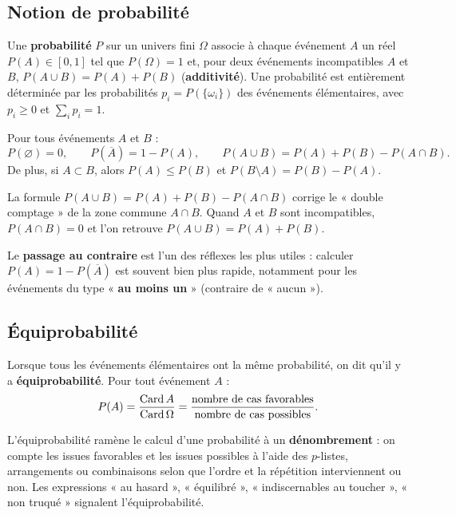 \subsection{Notion de probabilité}

\begin{definition}[Probabilité]
Une \textbf{probabilité} $P$ sur un univers fini $\Omega$ associe à chaque
événement $A$ un réel $P(A)\in[0,1]$ tel que $P(\Omega)=1$ et, pour deux
événements incompatibles $A$ et $B$, $P(A\cup B)=P(A)+P(B)$ (\textbf{additivité}).
Une probabilité est entièrement déterminée par les probabilités $p_i=P(\{\omega_i\})$
des événements élémentaires, avec $p_i\ge0$ et $\sum_i p_i=1$.
\end{definition}

\begin{propriete}
Pour tous événements $A$ et $B$ :
\[
P(\varnothing)=0,\qquad
P(\overline A)=1-P(A),\qquad
P(A\cup B)=P(A)+P(B)-P(A\cap B).
\]
De plus, si $A\subset B$, alors $P(A)\le P(B)$ et $P(B\setminus A)=P(B)-P(A)$.
\end{propriete}

\begin{remarque}
La formule $P(A\cup B)=P(A)+P(B)-P(A\cap B)$ corrige le « double comptage » de la
zone commune $A\cap B$. Quand $A$ et $B$ sont incompatibles, $P(A\cap B)=0$ et l'on
retrouve $P(A\cup B)=P(A)+P(B)$.
\end{remarque}

\begin{aretenir}
Le \textbf{passage au contraire} est l'un des réflexes les plus utiles :
calculer $P(A)=1-P(\overline A)$ est souvent bien plus rapide, notamment pour les
événements du type « \textbf{au moins un} » (contraire de « aucun »).
\end{aretenir}

\subsection{Équiprobabilité}

\begin{definition}
Lorsque tous les événements élémentaires ont la même probabilité, on dit qu'il y
a \textbf{équiprobabilité}. Pour tout événement $A$ :
\[
P(A)=\frac{\operatorname{Card} A}{\operatorname{Card}\Omega}
=\frac{\text{nombre de cas favorables}}{\text{nombre de cas possibles}}.
\]
\end{definition}

\begin{remarque}
L'équiprobabilité ramène le calcul d'une probabilité à un \textbf{dénombrement} :
on compte les issues favorables et les issues possibles à l'aide des $p$-listes,
arrangements ou combinaisons selon que l'ordre et la répétition interviennent ou
non. Les expressions « au hasard », « équilibré », « indiscernables au toucher »,
« non truqué » signalent l'équiprobabilité.
\end{remarque}

